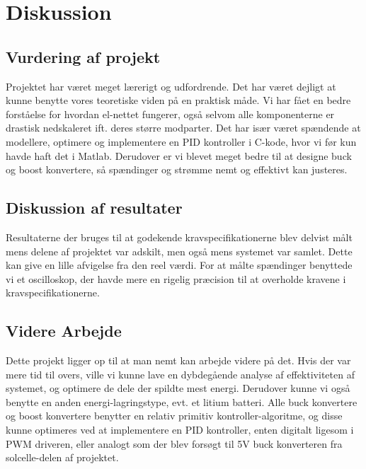 \documentclass[../main.tex]{subfiles}
\begin{document}
\chapter{Diskussion} \label{Chap:Diskusion}
\section{Vurdering af projekt}
Projektet har været meget lærerigt og udfordrende. Det har været dejligt at kunne benytte vores teoretiske viden på en praktisk måde. Vi har fået en bedre forståelse for hvordan el-nettet fungerer, også selvom alle komponenterne er drastisk nedskaleret ift. deres større modparter. Det har især været spændende at modellere, optimere og implementere en PID kontroller i C-kode, hvor vi før kun havde haft det i Matlab. Derudover er vi blevet meget bedre til at designe buck og boost konvertere, så spændinger og strømme nemt og effektivt kan justeres.

\section{Diskussion af resultater}
Resultaterne der bruges til at godekende kravspecifikationerne blev delvist målt mens delene af projektet var adskilt, men også mens systemet var samlet. Dette kan give en lille afvigelse fra den reel værdi. For at målte spændinger benyttede vi et oscilloskop, der havde mere en rigelig præcision til at overholde kravene i kravspecifikationerne. 

\section{Videre Arbejde}
Dette projekt ligger op til at man nemt kan arbejde videre på det. Hvis der var mere tid til overs, ville vi kunne lave en dybdegående analyse af effektiviteten af systemet, og optimere de dele der spildte mest energi. Derudover kunne vi også benytte en anden energi-lagringstype, evt. et litium batteri. Alle buck konvertere og boost konvertere benytter en relativ primitiv kontroller-algoritme, og disse kunne optimeres ved at implementere en PID kontroller, enten digitalt ligesom i PWM driveren, eller analogt som der blev forsøgt til 5V buck konverteren fra solcelle-delen af projektet. 
\end{document}
